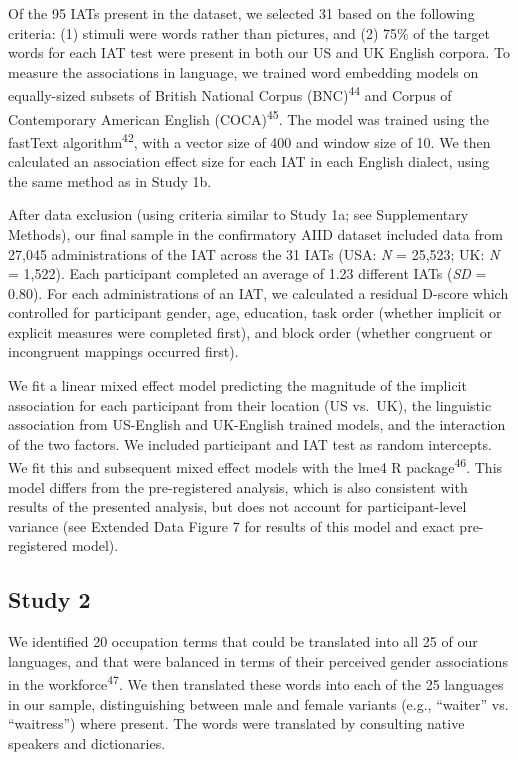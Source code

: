 \documentclass[11pt]{wlscirep}
\begin{document}
Of the 95 IATs present in the dataset, we selected 31 based on the following criteria: (1) stimuli were words rather than pictures, and (2) 75\% of the target words for each IAT test were present in both our US and UK English corpora. To measure the associations in language, we trained word embedding models on equally-sized subsets of British National Corpus (BNC)\textsuperscript{44} and Corpus of Contemporary American English (COCA)\textsuperscript{45}. The model was trained using the fastText algorithm\textsuperscript{42}, with a vector size of 400 and  window size of 10. We then calculated an association effect size for each IAT in each English dialect, using the same method as in Study 1b. 


After data exclusion (using criteria similar to Study 1a; see Supplementary Methods), our final sample
in the confirmatory AIID dataset included data from 27,045 administrations of the IAT across the 31 IATs (USA: \emph{N} = 25,523; UK: \emph{N} = 1,522). Each participant
completed an average of 1.23 different IATs (\emph{SD} = 0.80). For each administrations of an IAT, we calculated a residual D-score which controlled for participant gender, age, education, task order (whether implicit or explicit measures were completed first), and block order (whether congruent or incongruent mappings occurred first).

We fit a linear mixed effect model predicting the magnitude of the implicit association for each participant from their location (US vs.\ UK), the linguistic association from US-English and UK-English trained models, and the interaction of the two factors. We included participant and IAT test as random intercepts. We fit this and subsequent mixed effect models with the lme4 R package\textsuperscript{46}. This model differs from the pre-registered analysis, which is also consistent with results of the presented analysis, but does not account for participant-level variance (see Extended Data Figure 7 for results of this model and exact pre-registered model).


\subsection*{Study 2}

We identified 20 occupation terms that could be translated into  all 25 of our languages, and that were balanced in terms of their perceived gender associations in the workforce\textsuperscript{47}. We
then translated these words into each of the 25 languages in our sample,
distinguishing between male and female variants (e.g., \enquote{waiter}
vs. \enquote{waitress}) where present. The words were translated by
consulting native speakers and dictionaries.
\end{document}
